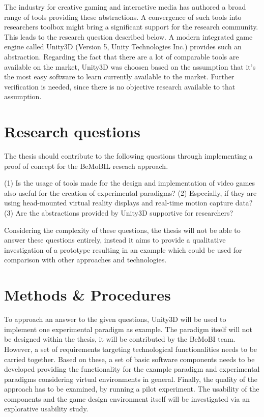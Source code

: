 \documentclass[	DIV=calc, paper=a4,	fontsize=11pt, twocolumn]{scrartcl}
\begin{document}
The industry for creative gaming and interactive media has authored a broad range of tools providing these abstractions. A convergence of such tools into researchers toolbox might bring a significant support for the research community. This leads to the research question described below. A modern integrated game engine called Unity3D (Version 5, Unity Technologies Inc.) provides such an abstraction. 
Regarding the fact that there are a lot of comparable tools are available on the market, Unity3D was choosen based on the assumption that it's the most easy software to learn currently available to the market. Further verification is needed, since there is no objective research available to that assumption.

\section*{Research questions}
The thesis should contribute to the following questions through implementing a proof of concept for the BeMoBIL reseach approach.

(1) Is the usage of tools made for the design and implementation of video games also useful for the creation of experimental paradigms? 
(2) Especially, if they are using head-mounted virtual reality displays and real-time motion capture data?
(3) Are the abstractions provided by Unity3D supportive for researchers? 

Considering the complexity of these questions, the thesis will not be able to answer these questions entirely, instead it aims to provide a qualitative investigation of a prototype resulting in an example which could be used for comparison with other approaches and technologies.

\section*{Methods \& Procedures}
To approach an answer to the given questions, Unity3D will be used to implement one experimental paradigm as example. The paradigm itself will not be designed within the thesis, it will be contributed by the BeMoBI team. However, a set of requirements targeting technological functionalities needs to be carried together. Based on these, a set of basic software components needs to be developed providing the functionality for the example paradigm and experimental paradigms considering virtual environments in general. 
Finally, the quality of the approach has to be examined, by running a pilot experiment. The usability of the components and the game design environment itself will be investigated via an explorative usability study. 
\end{document}
